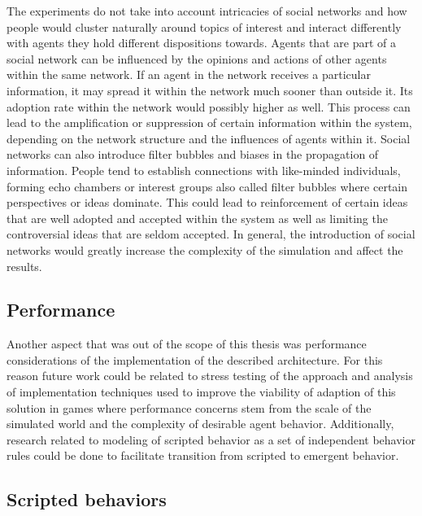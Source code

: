 The experiments do not take into account intricacies of social networks and how people would cluster naturally around topics of interest and interact differently with agents they hold different dispositions towards.
Agents that are part of a social network can be influenced by the opinions and actions of other agents within the same network.
If an agent in the network receives a particular information, it may spread it within the network much sooner than outside it.
Its adoption rate within the network would possibly higher as well.
This process can lead to the amplification or suppression of certain information within the system, depending on the network structure and the influences of agents within it.
Social networks can also introduce filter bubbles and biases in the propagation of information.
People tend to establish connections with like-minded individuals, forming echo chambers or interest groups also called filter bubbles where certain perspectives or ideas dominate.
This could lead to reinforcement of certain ideas that are well adopted and accepted within the system as well as limiting the controversial ideas that are seldom accepted.
In general, the introduction of social networks would greatly increase the complexity of the simulation and affect the results.

\subsection{Performance}

Another aspect that was out of the scope of this thesis was performance considerations of the implementation of the described architecture.
For this reason future work could be related to stress testing of the approach and analysis of implementation techniques used to improve the viability of adaption of this solution in games where performance concerns stem from the scale of the simulated world and the complexity of desirable agent behavior.
Additionally, research related to modeling of scripted behavior as a set of independent behavior rules could be done to facilitate transition from scripted to emergent behavior.

\subsection{Scripted behaviors}

